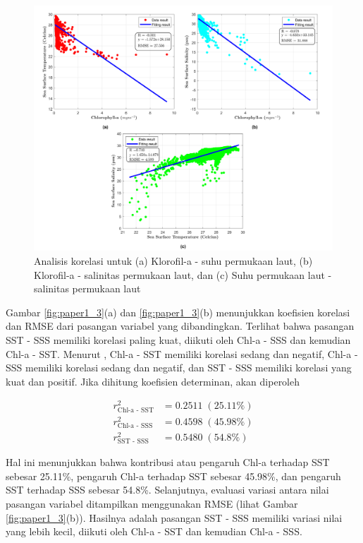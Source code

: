 \begin{spacing}{1.5}
	\begin{figure}[H]
		\centering
		\includegraphics[width=15cm]{contents/final_figure_paper1/gambar_2}
		\caption{Analisis korelasi untuk (a) Klorofil-a - suhu permukaan laut, (b) Klorofil-a - salinitas permukaan laut, dan (c) Suhu permukaan laut - salinitas permukaan laut}
		\label{fig:paper1_2}
	\end{figure}
	
	Gambar \ref{fig:paper1_3}(a) dan \ref{fig:paper1_3}(b) menunjukkan koefisien korelasi dan RMSE dari pasangan variabel yang dibandingkan. Terlihat bahwa pasangan SST - SSS memiliki korelasi paling kuat, diikuti oleh Chl-a - SSS dan kemudian Chl-a - SST. Menurut , Chl-a - SST memiliki korelasi sedang dan negatif, Chl-a - SSS memiliki korelasi sedang dan negatif, dan SST - SSS memiliki korelasi yang kuat dan positif. Jika dihitung koefisien determinan, akan diperoleh
	
	\begin{equation*}
		\begin{aligned}
			r^2_\text{Chl-a - SST}&=0.2511 \;(25.11\%) \\
			r^2_\text{Chl-a - SSS}&=0.4598 \;(45.98\%) \\
			r^2_\text{SST - SSS}&=0.5480 \;(54.8\%) 
		\end{aligned}	
	\end{equation*} 
	 
	Hal ini menunjukkan bahwa kontribusi atau pengaruh Chl-a terhadap SST sebesar 25.11\%, pengaruh Chl-a terhadap SST sebesar 45.98\%, dan pengaruh SST terhadap SSS sebesar 54.8\%. Selanjutnya, evaluasi variasi antara nilai pasangan variabel ditampilkan menggunakan RMSE (lihat Gambar \ref{fig:paper1_3}(b)). Hasilnya adalah pasangan SST - SSS memiliki variasi nilai yang lebih kecil, diikuti oleh Chl-a - SST dan kemudian Chl-a - SSS.
	

\end{spacing}
